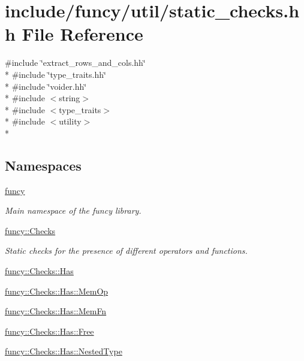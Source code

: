 \hypertarget{static__checks_8hh}{\section{include/funcy/util/static\-\_\-checks.hh File Reference}
\label{static__checks_8hh}
}
{\ttfamily \#include \char`\"{}extract\-\_\-rows\-\_\-and\-\_\-cols.\-hh\char`\"{}}\\*
{\ttfamily \#include \char`\"{}type\-\_\-traits.\-hh\char`\"{}}\\*
{\ttfamily \#include \char`\"{}voider.\-hh\char`\"{}}\\*
{\ttfamily \#include $<$string$>$}\\*
{\ttfamily \#include $<$type\-\_\-traits$>$}\\*
{\ttfamily \#include $<$utility$>$}\\*
\subsection*{Namespaces}
\begin{DoxyCompactItemize}
\item 
\hyperlink{namespacefuncy}{funcy}
\begin{DoxyCompactList}\small\item\em Main namespace of the funcy library. \end{DoxyCompactList}\item 
\hyperlink{namespacefuncy_1_1Checks}{funcy\-::\-Checks}
\begin{DoxyCompactList}\small\item\em Static checks for the presence of different operators and functions. \end{DoxyCompactList}\item 
\hyperlink{namespacefuncy_1_1Checks_1_1Has}{funcy\-::\-Checks\-::\-Has}
\item 
\hyperlink{namespacefuncy_1_1Checks_1_1Has_1_1MemOp}{funcy\-::\-Checks\-::\-Has\-::\-Mem\-Op}
\item 
\hyperlink{namespacefuncy_1_1Checks_1_1Has_1_1MemFn}{funcy\-::\-Checks\-::\-Has\-::\-Mem\-Fn}
\item 
\hyperlink{namespacefuncy_1_1Checks_1_1Has_1_1Free}{funcy\-::\-Checks\-::\-Has\-::\-Free}
\item 
\hyperlink{namespacefuncy_1_1Checks_1_1Has_1_1NestedType}{funcy\-::\-Checks\-::\-Has\-::\-Nested\-Type}
\end{DoxyCompactItemize}
